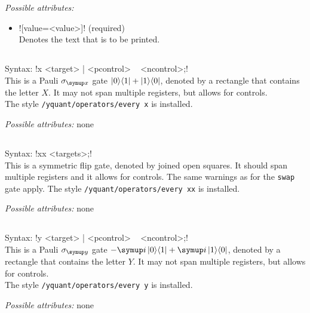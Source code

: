 \documentclass{scrartcl}
\def\ttlink{\link\texttt}
\def\ii{{\symup i}}
\def\ketbra#1#2{\ket{#1}\!\bra{#2}}
\begin{document}
         \emph{Possible attributes:}
         \begin{itemize}
            \item \yquant![value=<value>]! (required) \\
               Denotes the text that is to be printed.
         \end{itemize}

      \subsection{\texorpdfstring{}{x}}
         Syntax: \yquant!x <target> | <pcontrol> ~ <ncontrol>;! \\
         This is a Pauli $\sigma_{\symup x}$ gate $\ketbra01 + \ketbra10$, denoted by a rectangle that contains the letter $X$.
         It may not span multiple registers, but allows for controls. \\
         The style \ttlink{/yquant/operators/every x} is installed.

         \emph{Possible attributes:} none

      \subsection{\texorpdfstring{}{xx}}
         Syntax: \yquant!xx <targets>;! \\
         This is a symmetric flip gate, denoted by joined open squares.
         It should span multiple registers and it allows for controls.
         The same warnings as for the \ttlink{swap} gate apply.
         The style \ttlink{/yquant/operators/every xx} is installed.

         \emph{Possible attributes:} none

      \subsection{\texorpdfstring{}{y}}
         Syntax: \yquant!y <target> | <pcontrol> ~ <ncontrol>;! \\
         This is a Pauli $\sigma_{\symup y}$ gate $-\ii\ketbra01 + \ii\ketbra10$, denoted by a rectangle that contains the letter $Y$.
         It may not span multiple registers, but allows for controls. \\
         The style \ttlink{/yquant/operators/every y} is installed.

         \emph{Possible attributes:} none
\end{document}
